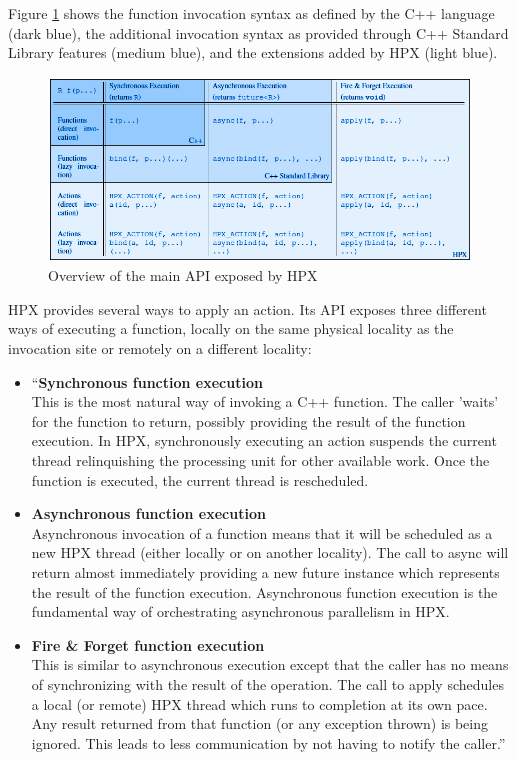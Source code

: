 Figure \ref{fig:hpx-api} shows the function invocation syntax as defined by the C++ language (dark blue), the additional invocation syntax as provided through C++ Standard Library features (medium blue), and the extensions added by HPX (light blue)\cite{kaiser2014hpx}.

\begin{figure}[ht]
\centering
\includegraphics[scale=0.72]{images/hpx_the_api.png}
\caption[Overview of the main API exposed by HPX]{Overview of the main API exposed by HPX}
\label{fig:hpx-api}
\end{figure}

HPX provides several ways to apply an action. Its API exposes three different ways of executing a function, locally on the same physical locality as the invocation site or remotely on a different locality:

\begin{itemize}
\item ``\textbf{Synchronous function execution}\\
  This is the most natural way of invoking a C++ function. The caller ’waits’ for the function to return, possibly providing the result of the function execution. In HPX, synchronously executing an action suspends the current thread relinquishing the processing unit for other available work. Once the function is executed, the current thread is rescheduled.

\item \textbf{Asynchronous function execution}\\
  Asynchronous invocation of a function means that it will be scheduled as a new HPX thread (either locally or on another locality). The call to async will return almost immediately providing a new future instance which represents the result of the function execution. Asynchronous function execution is the fundamental way of orchestrating asynchronous parallelism in HPX.

\item \textbf{Fire \& Forget function execution}\\
  This is similar to asynchronous execution except that the caller has no means of synchronizing with the result of the operation. The call to apply schedules a local (or remote) HPX thread which runs to completion at its own pace. Any result returned from that function (or any exception thrown) is being ignored. This leads to less communication by not having to notify the caller.''\cite{kaiser2014hpx}
\end{itemize}


